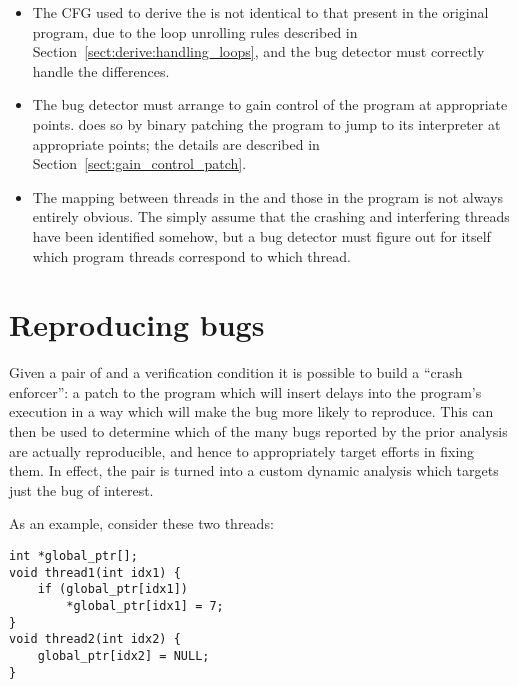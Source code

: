 \begin{itemize}
\item The CFG used to derive the {\StateMachine} is not identical to
  that present in the original program, due to the loop unrolling
  rules described in Section~\ref{sect:derive:handling_loops}, and the
  bug detector must correctly handle the differences.
\item The bug detector must arrange to gain control of the program at
  appropriate points.  {\Implementation} does so by binary patching
  the program to jump to its interpreter at appropriate points; the
  details are described in Section~\ref{sect:gain_control_patch}.
\item The mapping between threads in the {\StateMachine} and those in
  the program is not always entirely obvious.  The {\StateMachines}
  simply assume that the crashing and interfering threads have been
  identified somehow, but a bug detector must figure out for itself
  which program threads correspond to which {\StateMachine} thread.
\end{itemize}



\section{Reproducing bugs}
\label{sect:reproducing_bugs}


Given a pair of {\StateMachines} and a verification condition it is
possible to build a ``crash enforcer'': a patch to the program which
will insert delays into the program's execution in a way which will
make the bug more likely to reproduce.  This can then be used to
determine which of the many bugs reported by the prior analysis are
actually reproducible, and hence to appropriately target efforts in
fixing them.  In effect, the {\StateMachine} pair is turned into a
custom dynamic analysis which targets just the bug of interest.

As an example, consider these two threads:

\begin{verbatim}
int *global_ptr[];
void thread1(int idx1) {
    if (global_ptr[idx1])
        *global_ptr[idx1] = 7;
} 
void thread2(int idx2) {
    global_ptr[idx2] = NULL;
}
\end{verbatim}

